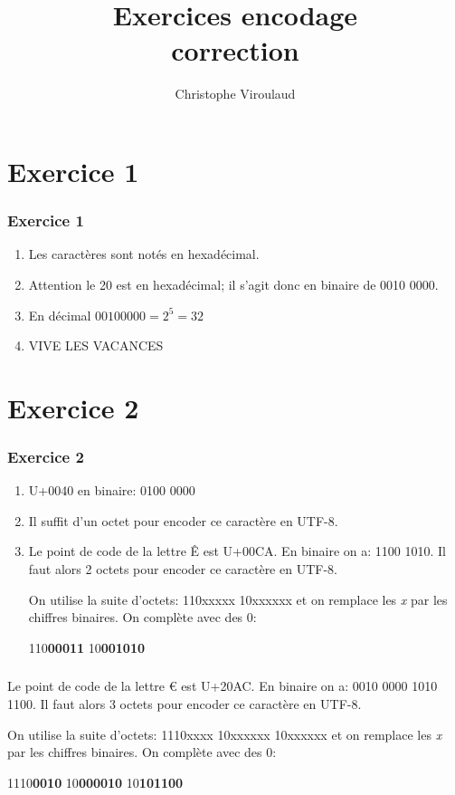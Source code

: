\documentclass[svgnames,11pt]{beamer}
\author[]{Christophe Viroulaud}
\title{Exercices encodage\\correction}
\date{\framebox{\textbf{DonRep 15}}}
\institute{Première - NSI}
\begin{document}
\begin{frame}
    \titlepage
\end{frame}
\section{Exercice 1}
\begin{frame}
    \frametitle{Exercice 1}

    \begin{enumerate}
        \item Les caractères sont notés en hexadécimal.
        \item Attention le 20 est en hexadécimal; il s'agit donc en binaire de 0010 0000.
        \item En décimal $00100000 = 2^5 = 32$
        \item VIVE LES VACANCES
    \end{enumerate}

\end{frame}
\section{Exercice 2}
\begin{frame}
    \frametitle{Exercice 2}

    \begin{enumerate}
        \item U+0040 en binaire: 0100 0000
        \item Il suffit d'un octet pour encoder ce caractère en UTF-8.
        \item Le point de code de la lettre Ê est U+00CA. En binaire on a: 1100 1010. Il faut alors 2 octets pour encoder ce caractère en UTF-8.

              On utilise la suite d'octets: 110xxxxx 10xxxxxx et on remplace les \emph{x} par les chiffres binaires. On complète avec des 0:
              \begin{center}
                  110\textbf{00011} 10\textbf{001010}

              \end{center}
    \end{enumerate}

\end{frame}
\begin{frame}
    \frametitle{}

    Le point de code de la lettre € est U+20AC. En binaire on a: 0010 0000 1010 1100. Il faut alors 3 octets pour encoder ce caractère en UTF-8.

              On utilise la suite d'octets: 1110xxxx 10xxxxxx 10xxxxxx et on remplace les \emph{x} par les chiffres binaires. On complète avec des 0:
              \begin{center}
                1110\textbf{0010} 10\textbf{000010} 10\textbf{101100}

              \end{center}

\end{frame}
\end{document}
